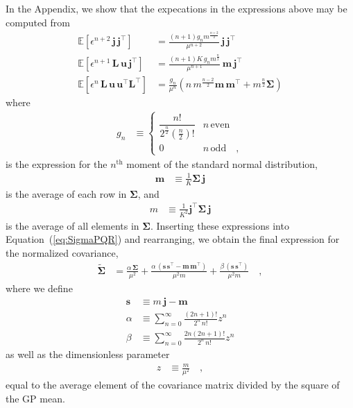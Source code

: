 \documentclass[modern]{aastex62}
\begin{document}
%
In the Appendix, we show that the expecations in the expressions above may be computed from
%
\begin{align}
    \mathbb{E}\left[
        \epsilon^{n + 2} \, \mathbf{j} \, \mathbf{j}^\top
        \right]
     & =
    \frac{(n + 1) g_{n} m^\frac{n+2}{2}}{\mu^{n+2}} \, \mathbf{j} \, \mathbf{j}^\top
    \\[0.5em]
    \mathbb{E}\left[
        \epsilon^{n + 1} \, \mathbf{L} \, \mathbf{u} \, \mathbf{j}^\top
        \right]
     & =
    \frac{(n + 1) K \, g_{n} m^\frac{n}{2}}{\mu^{n+1}} \, \mathbf{m} \, \mathbf{j}^\top
    \\[0.5em]
    \mathbb{E}\left[
        \epsilon^n \, \mathbf{L} \, \mathbf{u} \, \mathbf{u}^\top \mathbf{L}^\top
        \right]
     & =
    \frac{g_n}{\mu^n} \left(
    n \,  m^\frac{n - 2}{2} \mathbf{m} \, \mathbf{m}^\top + m^\frac{n}{2} \pmb{\Sigma}
    \right)
\end{align}
%
where
%
\begin{align}
    g_n
     & \equiv
    \begin{cases}
        \dfrac{n!}{2^\frac{n}{2} \left(\frac{n}{2}\right)!} & n \, \mathrm{even}
        \\
        0                                                   & n \, \mathrm{odd}
        \quad,
    \end{cases}
\end{align}
%
is the expression for the $n^\mathrm{th}$ moment of the standard normal distribution,
%
\begin{align}
    \mathbf{m}
     & \equiv
    \frac{1}{K} \pmb{\Sigma} \, \mathbf{j}
\end{align}
%
is the average of each row in $\pmb{\Sigma}$, and
%
\begin{align}
    m
     & \equiv
    \frac{1}{K^2} \mathbf{j}^\top \pmb{\Sigma} \, \mathbf{j}
\end{align}
%
is the average of all elements in $\pmb{\Sigma}$.
%
Inserting these expressions into Equation~(\ref{eq:SigmaPQR}) and rearranging, we obtain
the final expression for the normalized covariance,
%
\begin{align}
    \label{eq:SigmaTilde}
    \tilde{\pmb{\Sigma}}
     & =
    \frac{\alpha \, \pmb{\Sigma}}{\mu^2}  +
    \frac{\alpha \, \left(\mathbf{s} \, \mathbf{s}^\top - \mathbf{m} \, \mathbf{m}^\top\right)}{\mu^2 m}  +
    \frac{\beta \, \left(\mathbf{s} \, \mathbf{s}^\top\right)}{\mu^2 m}
    \quad,
\end{align}
%
where we define
%
\begin{align}
    \mathbf{s}
     & \equiv
    m \, \mathbf{j} - \mathbf{m}
    \\[1em]
    \label{eq:alpha}
    \alpha
     & \equiv
    \sum\limits_{n=0}^\infty
    \frac{(2n + 1)!}{2^n \, n!}
    z^n
    \\[1em]
    \label{eq:beta}
    \beta
     & \equiv
    \sum\limits_{n=0}^\infty
    \frac{2n(2n + 1)!}{2^n \, n!}
    z^n
\end{align}
%
as well as the dimensionless parameter
%
\begin{align}
    z & \equiv \frac{m}{\mu^2}
    \quad,
\end{align}
%
equal to the average element of the covariance matrix divided by the square of the
GP mean.
\end{document}
